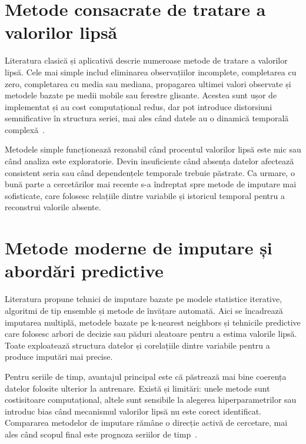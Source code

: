 \section{Metode consacrate de tratare a valorilor lipsă}

Literatura clasică și aplicativă descrie numeroase metode de tratare a valorilor lipsă. Cele mai simple includ eliminarea observațiilor incomplete, completarea cu zero, completarea cu media sau mediana, propagarea ultimei valori observate și metodele bazate pe medii mobile sau ferestre glisante. Acestea sunt ușor de implementat și au cost computațional redus, dar pot introduce distorsiuni semnificative în structura seriei, mai ales când datele au o dinamică temporală complexă~\cite{little2002missing, schafer2002missing}.

Metodele simple funcționează rezonabil când procentul valorilor lipsă este mic sau când analiza este exploratorie. Devin insuficiente când absența datelor afectează consistent seria sau când dependențele temporale trebuie păstrate. Ca urmare, o bună parte a cercetărilor mai recente s-a îndreptat spre metode de imputare mai sofisticate, care folosesc relațiile dintre variabile și istoricul temporal pentru a reconstrui valorile absente.

\section{Metode moderne de imputare și abordări predictive}

Literatura propune tehnici de imputare bazate pe modele statistice iterative, algoritmi de tip ensemble și metode de învățare automată. Aici se încadrează imputarea multiplă, metodele bazate pe k-nearest neighbors și tehnicile predictive care folosesc arbori de decizie sau păduri aleatoare pentru a estima valorile lipsă. Toate exploatează structura datelor și corelațiile dintre variabile pentru a produce imputări mai precise.

Pentru seriile de timp, avantajul principal este că păstrează mai bine coerența datelor folosite ulterior la antrenare. Există și limitări: unele metode sunt costisitoare computațional, altele sunt sensibile la alegerea hiperparametrilor sau introduc bias când mecanismul valorilor lipsă nu este corect identificat. Compararea metodelor de imputare rămâne o direcție activă de cercetare, mai ales când scopul final este prognoza seriilor de timp~\cite{buuren2011mice, stekhoven2012missforest, breiman2001rf, che2018rnnmissing}.

